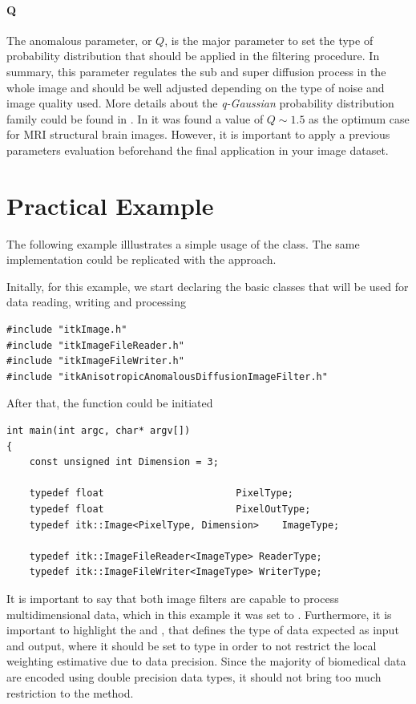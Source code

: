 \documentclass{InsightArticle}
\begin{document}
 \paragraph{Q}
 The anomalous parameter, or $Q$, is the major parameter to set the type of probability distribution that should be applied in the filtering procedure. In summary, this parameter regulates the sub and super diffusion process in the whole image and should be well adjusted depending on the type of noise and image quality used. More details about the \textit{q-Gaussian} probability distribution family could be found in \cite{Tsallis2009Livro,Schwammle2008}. In \cite{SenraFilho2015} it was found a value of $Q\sim1.5$ as the optimum case for MRI structural brain images. However, it is important to apply a previous parameters evaluation beforehand the final application in your image dataset.
 

\section{Practical Example}

The following example illlustrates a simple usage of the  class. The same implementation could be replicated with the  approach.

Initally, for this example, we start declaring the basic classes that will be used for data reading, writing and processing

\small
\begin{verbatim}
#include "itkImage.h"
#include "itkImageFileReader.h"
#include "itkImageFileWriter.h"
#include "itkAnisotropicAnomalousDiffusionImageFilter.h"
\end{verbatim}
\normalsize

After that, the  function could be initiated

\small
\begin{verbatim}
int main(int argc, char* argv[])
{
    const unsigned int Dimension = 3;

    typedef float                       PixelType;
    typedef float                       PixelOutType;
    typedef itk::Image<PixelType, Dimension>    ImageType;

    typedef itk::ImageFileReader<ImageType> ReaderType;
    typedef itk::ImageFileWriter<ImageType> WriterType;
\end{verbatim}
\normalsize

It is important to say that both image filters are capable to process multidimensional data, which in this example it was set to . Furthermore, it is important to highlight the  and , that defines the type of data expected as input and output, where it should be set to  type in order to not restrict the local weighting estimative due to data precision. Since the majority of biomedical data are encoded using double precision data types, it should not bring too much restriction to the method.
\end{document}
